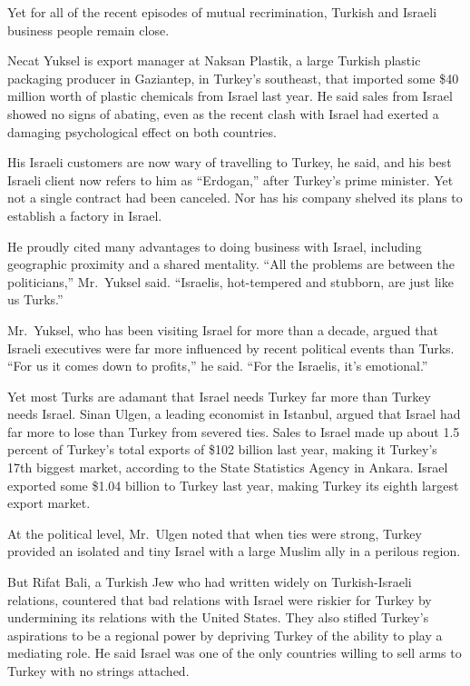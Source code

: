 ﻿\documentclass[12pt]{article}
\begin{document}
Yet for all of the recent episodes of mutual recrimination, Turkish and Israeli business people
remain close.

Necat Yuksel is export manager at Naksan Plastik, a large Turkish plastic packaging producer in
Gaziantep, in Turkey's southeast, that imported some \$40 million worth of plastic chemicals from
Israel last year. He said sales from Israel showed no signs of abating, even as the recent clash
with Israel had exerted a damaging psychological effect on both countries.

His Israeli customers are now wary of travelling to Turkey, he said, and his best Israeli client now
refers to him as ``Erdogan,'' after Turkey's prime minister. Yet not a single contract had been
canceled. Nor has his company shelved its plans to establish a factory in Israel.

He proudly cited many advantages to doing business with Israel, including geographic proximity and a
shared mentality. ``All the problems are between the politicians,'' Mr.~Yuksel said. ``Israelis,
hot-tempered and stubborn, are just like us Turks.''

Mr.~Yuksel, who has been visiting Israel for more than a decade, argued that Israeli executives were
far more influenced by recent political events than Turks. ``For us it comes down to profits,'' he
said. ``For the Israelis, it's emotional.''

Yet most Turks are adamant that Israel needs Turkey far more than Turkey needs Israel. Sinan Ulgen,
a leading economist in Istanbul, argued that Israel had far more to lose than Turkey from severed
ties. Sales to Israel made up about 1.5 percent of Turkey's total exports of \$102 billion last
year, making it Turkey's 17th biggest market, according to the State Statistics Agency in Ankara.
Israel exported some \$1.04 billion to Turkey last year, making Turkey its eighth largest export
market.

At the political level, Mr.~Ulgen noted that when ties were strong, Turkey provided an isolated and
tiny Israel with a large Muslim ally in a perilous region.

But Rifat Bali, a Turkish Jew who had written widely on Turkish-Israeli relations, countered that
bad relations with Israel were riskier for Turkey by undermining its relations with the United
States. They also stifled Turkey's aspirations to be a regional power by depriving Turkey of the
ability to play a mediating role. He said Israel was one of the only countries willing to sell arms
to Turkey with no strings attached.
\end{document}
